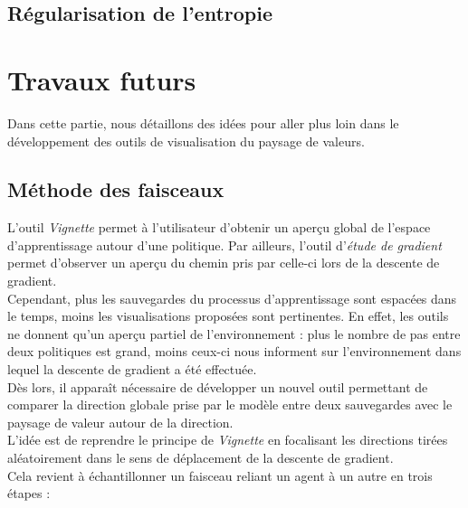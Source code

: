 \documentclass[12pt]{article}
\begin{document}
\subsection{Régularisation de l'entropie}

\section{Travaux futurs}
\label{future}

Dans cette partie, nous détaillons des idées pour aller plus loin dans le développement des outils de visualisation du paysage de valeurs. \\

\subsection{Méthode des faisceaux}

L'outil \emph{Vignette} permet à l'utilisateur d'obtenir un aperçu global de l'espace d'apprentissage autour d'une politique. Par ailleurs, l'outil d'\emph{étude de gradient} permet d'observer un aperçu du chemin pris par celle-ci lors de la descente de gradient. \\

Cependant, plus les sauvegardes du processus d'apprentissage sont espacées dans le temps, moins les visualisations proposées sont pertinentes. En effet, les outils ne donnent qu'un aperçu partiel de l'environnement : plus le nombre de pas entre deux politiques est grand, moins ceux-ci nous informent sur l'environnement dans lequel la descente de gradient a été effectuée. \\

Dès lors, il apparaît nécessaire de développer un nouvel outil permettant de comparer la direction globale prise par le modèle entre deux sauvegardes avec le paysage de valeur autour de la direction. \\

L'idée est de reprendre le principe de \emph{Vignette} en focalisant les directions tirées aléatoirement dans le sens de déplacement de la descente de gradient. \\

Cela revient à échantillonner un faisceau reliant un agent à un autre en trois étapes : \\
\end{document}
